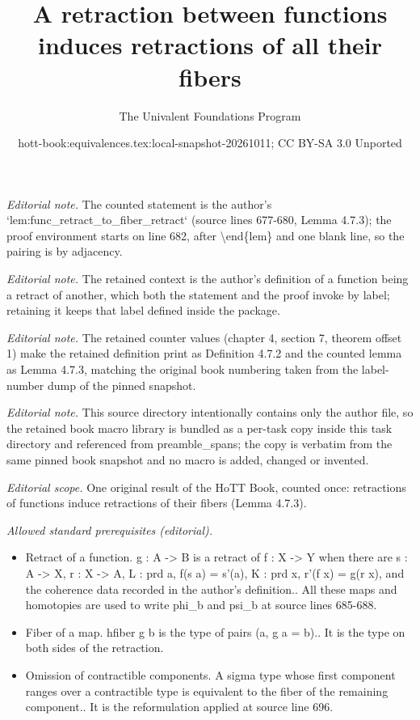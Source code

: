 \documentclass[10pt,a4paper]{article}
\title{A retraction between functions induces retractions of all their fibers}
\author{The Univalent Foundations Program}
\date{hott-book:equivalences.tex:local-snapshot-20261011; CC BY-SA 3.0 Unported}
\newcounter{chapter}
\theoremstyle{definition}
\theoremstyle{remark}
\numberwithin{equation}{section}
\begin{document}
\maketitle
\setcounter{chapter}{4}
\setcounter{section}{7}
\setcounter{thm}{1}
\noindent\textit{Editorial note.} The counted statement is the author's `lem:func\_retract\_to\_fiber\_retract` (source lines 677-680, Lemma 4.7.3); the proof environment starts on line 682, after \textbackslash{}end\{lem\} and one blank line, so the pairing is by adjacency.\par\medskip
\noindent\textit{Editorial note.} The retained context is the author's definition of a function being a retract of another, which both the statement and the proof invoke by label; retaining it keeps that label defined inside the package.\par\medskip
\noindent\textit{Editorial note.} The retained counter values (chapter 4, section 7, theorem offset 1) make the retained definition print as Definition 4.7.2 and the counted lemma as Lemma 4.7.3, matching the original book numbering taken from the label-number dump of the pinned snapshot.\par\medskip
\noindent\textit{Editorial note.} This source directory intentionally contains only the author file, so the retained book macro library is bundled as a per-task copy inside this task directory and referenced from preamble\_spans; the copy is verbatim from the same pinned book snapshot and no macro is added, changed or invented.\par\medskip
\noindent\textit{Editorial scope.} One original result of the HoTT Book, counted once: retractions of functions induce retractions of their fibers (Lemma 4.7.3).\par\medskip
\noindent\textit{Allowed standard prerequisites (editorial).}\begin{itemize}
\item Retract of a function. g : A -> B is a retract of f : X -> Y when there are s : A -> X, r : X -> A, L : prd a, f(s a) = s'(a), K : prd x, r'(f x) = g(r x), and the coherence data recorded in the author's definition.. All these maps and homotopies are used to write phi\_b and psi\_b at source lines 685-688.
\item Fiber of a map. hfiber g b is the type of pairs (a, g a = b).. It is the type on both sides of the retraction.
\item Omission of contractible components. A sigma type whose first component ranges over a contractible type is equivalent to the fiber of the remaining component.. It is the reformulation applied at source line 696.
\end{itemize}\medskip
\end{document}
